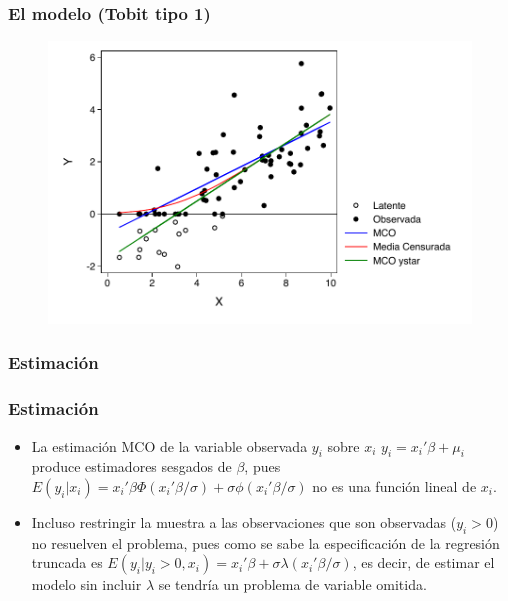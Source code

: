 \begin{frame}
	\frametitle{El modelo (Tobit tipo 1)}
	
	
	\begin{figure}
		\includegraphics[scale=0.75]{fig/cenreg.pdf}
	\end{figure}
\end{frame}

\subsubsection{Estimación}

\begin{frame}
	\frametitle{Estimación}
	
	\begin{itemize}
		\item  La estimación MCO de la variable observada $y_i$ sobre $x_i$
		$y_i=x_i'\beta+\mu_i$ produce estimadores sesgados de $\beta$,
		pues $E(y_i|x_i)=x_i'\beta\Phi(x_i'\beta/\sigma)+\sigma
		\phi(x_i'\beta/\sigma)$ no es una función lineal de $x_i$. 
		\item Incluso restringir la muestra a las observaciones que son observadas
		($y_i>0$) no resuelven el problema, pues como se sabe la
		especificación de la regresión truncada es
		$E(y_i|y_i>0,x_i)=x_i'\beta+ \sigma\lambda(x_i'\beta/\sigma)$, es
		decir, de estimar el modelo sin incluir $\lambda$ se tendría un
		problema de variable omitida.
	\end{itemize}
	
\end{frame}

